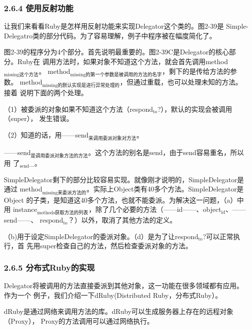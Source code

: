 \documentclass[11pt]{ctexart}
\begin{document}
\subsubsection{}
\label{sec:orgbf66694}
\subsubsection{2.6.4 使用反射功能}
\label{sec:org0770c55}

让我们来看看Ruby是怎样用反射功能来实现Delegator这个类的。图2-39是
Simple-Delegatro类的部分代码。为了容易理解，例子中程序被在幅度简化了。

图2-39的程序分为4个部分。首先说明最重要的。图2-39C是Delegator的核心部分。Ruby在
调用方法时，如果对象不知道这个方法，就会首先调用method\(_{\text{missing这个方法}}\)。
method\(_{\text{missing的第一个参数是被调用的方法的名字}}\)，剩下的是传给方法的参数。
method\(_{\text{missing的默认实现是进行异常处理的}}\)，但通过重载，也可以处理未知的方法。接着
说明下面的两个处理。

（1）被委派的对象如果不知道这个方法（respond\(_{\text{to}}\)?），默认的实现会被调用（super），
发生错误。

（2）知道的话，用——send\(_{\text{来调用委派对象对方法}}\)。

——send\(_{\text{是调用委派对象方法的方法}}\)。这个方法的别名是send，由于send容易重名，所以用
了\(_{\text{send}}\)\_。

SimpleDelegator剩下的部分比较容易实现。就像刚才说明的，SimpleDelegator是通过
method\(_{\text{missing来委派方法的}}\)。实际上Object类有40多个方法。SimpleDelegator是Object
的子类，是知道这40多个方法，也就不能委派。为解决这一问题，（a）中用
instance\(_{\text{mothods获取方法的列表}}\)，除了几个必要的方法（——id——、object\(_{\text{id}}\)、——send——、
respond\(_{\text{to}}\)？）以外，取消了其他方法的定义。

（b)用于设定SimpleDelegator的委派对象。（d）是为了让respond\(_{\text{to}}\)?可以正常执行，首
先用super检查自己的方法，然后检查委派对象的方法。
\subsubsection{2.6.5 分布式Ruby的实现}
\label{sec:org5cfc759}

Delegator将被调用的方法直接委派到其他对象，这一功能在很多领域都有应用。作为一个
例子，我们介绍一下dRuby(Distributed Ruby，分布式Ruby）。

dRuby是通过网络来调用方法的库。dRuby可以生成服务器上存在的远程对象（Proxy），
Proxy的方法调用可以通过网络执行。
\end{document}
